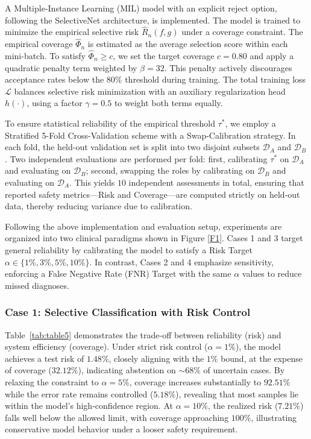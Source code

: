 \documentclass[journal,twoside,web]{ieeecolor}
\begin{document}
A Multiple-Instance Learning (MIL) model with an explicit reject option, following the SelectiveNet architecture, is implemented. The model is trained to minimize the empirical selective risk $\hat{R}_n(f,g)$ under a coverage constraint. The empirical coverage $\hat{\Phi}_n$ is estimated as the average selection score within each mini-batch. To satisfy $\hat{\Phi}_n \ge c$, we set the target coverage $c = 0.80$ and apply a quadratic penalty term weighted by $\beta = 32$. This penalty actively discourages acceptance rates below the 80\% threshold during training. The total training loss $\mathcal{L}$ balances selective risk minimization with an auxiliary regularization head $h(\cdot)$, using a factor $\gamma = 0.5$ to weight both terms equally.
 
To ensure statistical reliability of the empirical threshold $\tau^*$, we employ a Stratified 5-Fold Cross-Validation scheme with a Swap-Calibration strategy. In each fold, the held-out validation set is split into two disjoint subsets $\mathcal{D}_A$ and $\mathcal{D}_B$. Two independent evaluations are performed per fold: first, calibrating $\tau^*$ on $\mathcal{D}_A$ and evaluating on $\mathcal{D}_B$; second, swapping the roles by calibrating on $\mathcal{D}_B$ and evaluating on $\mathcal{D}_A$. This yields $10$ independent assessments in total, ensuring that reported safety metrics—Risk and Coverage—are computed strictly on held-out data, thereby reducing variance due to calibration.

Following the above implementation and evaluation setup, experiments are organized into two clinical paradigms shown in Figure \ref{F1}. Cases 1 and 3 target general reliability by calibrating the model to satisfy a Risk Target $\alpha \in \{1\%, 3\%, 5\%, 10\%\}$. In contrast, Cases 2 and 4 emphasize sensitivity, enforcing a False Negative Rate (FNR) Target with the same $\alpha$ values to reduce missed diagnoses.

\subsubsection{\textbf{Case 1: Selective Classification with Risk Control}}
\label{sec:case1_results}

Table~\ref{tab:table5} demonstrates the trade-off between reliability (risk) and system efficiency (coverage). Under strict risk control ($\alpha=1\%$), the model achieves a test risk of $1.48\%$, closely aligning with the $1\%$ bound, at the expense of coverage ($32.12\%$), indicating abstention on ${\sim}68\%$ of uncertain cases. By relaxing the constraint to $\alpha=5\%$, coverage increases substantially to $92.51\%$ while the error rate remains controlled ($5.18\%$), revealing that most samples lie within the model’s high-confidence region. At $\alpha=10\%$, the realized risk ($7.21\%$) falls well below the allowed limit, with coverage approaching $100\%$, illustrating conservative model behavior under a looser safety requirement.
\end{document}
